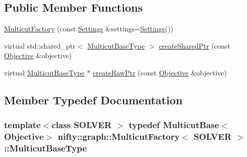 \subsection*{Public Member Functions}
\begin{DoxyCompactItemize}
\item 
\hyperlink{classnifty_1_1graph_1_1MulticutFactory_a080f784de6737af28b908645d8f35d8d}{Multicut\+Factory} (const \hyperlink{classnifty_1_1graph_1_1MulticutFactory_a79d62ed8a9b7af1024767db79ebbdabd}{Settings} \&settings=\hyperlink{classnifty_1_1graph_1_1MulticutFactory_a79d62ed8a9b7af1024767db79ebbdabd}{Settings}())
\item 
virtual std\+::shared\+\_\+ptr$<$ \hyperlink{classnifty_1_1graph_1_1MulticutFactory_abb18236a145c773fe597379289c0b659}{Multicut\+Base\+Type} $>$ \hyperlink{classnifty_1_1graph_1_1MulticutFactory_abb9450b461402e0f028c2e55a75d907a}{create\+Shared\+Ptr} (const \hyperlink{classnifty_1_1graph_1_1MulticutFactory_a631a3db484b95d061faced985d6f76fc}{Objective} \&objective)
\item 
virtual \hyperlink{classnifty_1_1graph_1_1MulticutFactory_abb18236a145c773fe597379289c0b659}{Multicut\+Base\+Type} $\ast$ \hyperlink{classnifty_1_1graph_1_1MulticutFactory_a03748f8c06f626503b0c02466d82fead}{create\+Raw\+Ptr} (const \hyperlink{classnifty_1_1graph_1_1MulticutFactory_a631a3db484b95d061faced985d6f76fc}{Objective} \&objective)
\end{DoxyCompactItemize}


\subsection{Member Typedef Documentation}
\hypertarget{classnifty_1_1graph_1_1MulticutFactory_abb18236a145c773fe597379289c0b659}{}
\subsubsection[{Multicut\+Base\+Type}]{\setlength{\rightskip}{0pt plus 5cm}template$<$class S\+O\+L\+V\+E\+R $>$ typedef {\bf Multicut\+Base}$<${\bf Objective}$>$ {\bf nifty\+::graph\+::\+Multicut\+Factory}$<$ S\+O\+L\+V\+E\+R $>$\+::{\bf Multicut\+Base\+Type}}\label{classnifty_1_1graph_1_1MulticutFactory_abb18236a145c773fe597379289c0b659}
\hypertarget{classnifty_1_1graph_1_1MulticutFactory_a631a3db484b95d061faced985d6f76fc}{}
